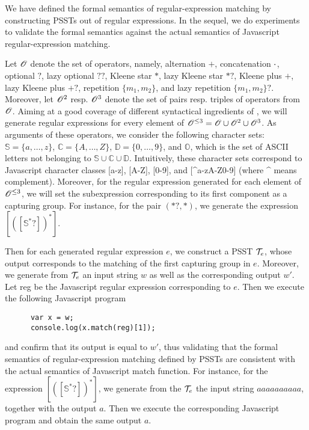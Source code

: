 
We have defined the formal semantics of regular-expression matching by constructing PSSTs out of regular expressions. 
In the sequel, we do experiments to validate the formal semantics against the actual semantics of Javascript regular-expression matching.

Let $\mathscr{O}$ denote the set of {\regexp} operators, namely, alternation $+$, concatenation $\cdot$, optional $?$, lazy optional $??$, Kleene star $*$, lazy Kleene star $*?$, Kleene plus $+$, lazy Kleene plus $+?$, repetition $\{m_1,m_2\}$, and lazy repetition $\{m_1,m_2\}?$. Moreover, let $\mathscr{O}^{2}$ resp. $\mathscr{O}^{3}$ denote the set of pairs resp. triples of operators from $\mathscr{O}$. 
Aiming at a good coverage of different syntactical ingredients of {\regexp}, we will generate regular expressions for every element of $\mathscr{O}^{\le 3} = \mathscr{O} \cup \mathscr{O}^2 \cup \mathscr{O}^3$.
As arguments of these operators, we consider the following character sets: $\mathbb{S} = \{a, \ldots, z\}$, $\mathbb{C}=\{A, \ldots, Z\}$, $\mathbb{D} = \{0,\ldots,9\}$, and $\mathbb{O}$, which is the set of ASCII letters not belonging to $\mathbb{S} \cup \mathbb{C} \cup \mathbb{D}$.
Intuitively, these character sets correspond to Javascript character classes [a-z], [A-Z], [0-9], and [{\textasciicircum}a-zA-Z0-9] (where {\textasciicircum} means complement).
Moreover, for the regular expression generated for each element of $\mathscr{O}^{\le 3}$, we will set the subexpression corresponding to its first component as a capturing group. 
For instance, for the pair $(*?, *)$, we generate the {\regexp} expression $[([\mathbb{S}^*?])^{*}]$.

Then for each generated regular expression $e$, we construct a PSST $\mathcal{T}_e$, whose output corresponds to the matching of the first capturing group in $e$.  Moreover, we generate from $\mathcal{T}_e$ an input string $w$ as well as the corresponding output $w'$. Let {\sf reg} be the Javascript regular expression corresponding to $e$. Then we execute the following Javascript program 
\begin{center}
{
\small
\begin{verbatim}
      var x = w; 
      console.log(x.match(reg)[1]);
\end{verbatim}
}
\end{center}
and confirm that its output is equal to $w'$, thus validating that the formal semantics of  regular-expression matching defined by PSSTs are consistent with the actual semantics of Javascript {\sf match} function. For instance, for the {\regexp} expression $[([\mathbb{S}^*?])^{*}]$, we generate from the $\mathcal{T}_e$ the input string $aaaaaaaaaa$, together with the output $a$. Then we execute the corresponding Javascript program and obtain the same output $a$.